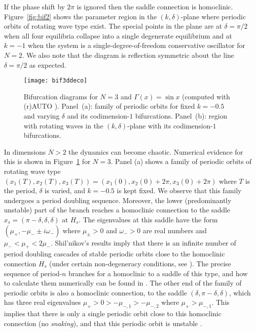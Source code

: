 \documentclass[aps,pre,twocolumn,a4paper,showkeys,showpacs]{revtex4}\usepackage{color}
\theoremstyle{plain}
\theoremstyle{plain}
\begin{document}
If the phase shift by $2\pi$ is ignored then the saddle connection is
homoclinic. Figure~\ref{fig:bif2} shows the parameter region in the
$(k,\delta)$-plane where periodic orbits of rotating wave type exist. The
special points in the plane are at $\delta=\pi/2$ when all four equilibria
collapse into a single degenerate equilibrium and at $k=-1$ when the system is
a single-degree-of-freedom conservative oscillator for $N=2$. We also note
that the diagram is reflection symmetric about the line $\delta=\pi/2$ as expected.

\begin{figure}[ptb]
\texttt{[image: bif3ddeco]}\caption{Bifurcation diagrams
for $N=3$ and $\Gamma(x)=\sin x$ (computed with (r)AUTO \cite{DCFKSW98,S07}).
Panel~(a): family of periodic orbits for fixed $k=-0.5$ and varying $\delta$
and its codimension-$1$ bifurcations. Panel~(b): region with rotating waves in
the $(k,\delta)$-plane with its codimension-$1$ bifurcations. }\label{fig:bif3}\end{figure}

In dimensions $N>2$ the dynamics can become chaotic. Numerical evidence for
this is shown in Figure~\ref{fig:bif3} for $N=3$. Panel (a) shows a family of
periodic orbits of rotating wave type $(x_{1}(T),x_{2}(T),x_{3}(T))=(x_{1}(0),x_{2}(0)+2\pi,x_{3}(0)+2\pi)$ where $T$ is the period, $\delta$ is varied,
and $k=-0.5$ is kept fixed. We observe that this family undergoes a period
doubling sequence. Moreover, the lower (predominantly unstable) part of the
branch reaches a homoclinic connection to the saddle $x_{s}=(\pi-\delta
,\delta,\delta)$ at $H_{s}$. The eigenvalues at this saddle have the form
$(\mu_{+},-\mu_{-}\pm i\omega_{-})$ where $\mu_{\pm}>0$ and $\omega_{-}>0$ are
real numbers and $\mu_{-}<\mu_{+}<2\mu_{-}$. Shil'nikov's results imply that
there is an infinite number of period doubling cascades of stable periodic
orbits close to the homoclinic connection $H_{s}$ (under certain
non-degeneracy conditions, see \cite{SSTC01,K04}). The precise sequence of
period-$n$ branches for a homoclinic to a saddle of this type, and how to
calculate them numerically can be found in \cite{OKC00}. The other end of the
family of periodic orbits is also a homoclinic connection, to the saddle
$(\delta,\pi-\delta,\delta)$, which has three real eigenvalues $\mu_{+}>0>-\mu_{-,1}>-\mu_{-,2}$ where $\mu_{+}>\mu_{-,1}$. This implies that there
is only a single periodic orbit close to this homoclinic connection (no
\emph{snaking}), and that this periodic orbit is unstable \cite{K04}.
\end{document}
